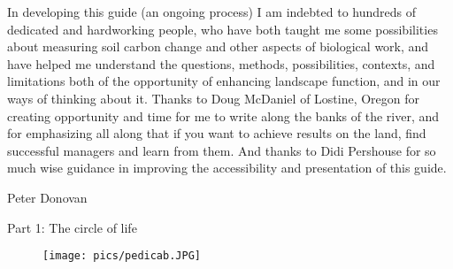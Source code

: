 \documentclass[11pt,letterpaper,twoside,onecolumn]{memoir}
\begin{document}
In developing this guide (an ongoing process) I am indebted to hundreds of dedicated and hardworking people, who have both taught me some possibilities about measuring soil carbon change and other aspects of biological work, and have helped me understand the questions, methods, possibilities, contexts, and limitations both of the opportunity of enhancing landscape function, and in our ways of thinking about it. Thanks to Doug McDaniel of Lostine, Oregon for creating opportunity and time for me to write along the banks of the river, and for emphasizing all along that if you want to achieve results on the land, find successful managers and learn from them. And thanks to Didi Pershouse for so much wise guidance in improving the accessibility and presentation of this guide.

\vspace{1em}
\hfill Peter Donovan


\mainmatter

\pagestyle{myheadings}
\renewcommand{\chaptermark}[1]{\markboth{#1}{}}




\Huge{Part 1: The circle of life}
\normalsize
\thispagestyle{empty}
\vspace*{5 em}
\begin{figure}[h]
\texttt{[image: pics/pedicab.JPG]}
\end{figure}



\end{document}
